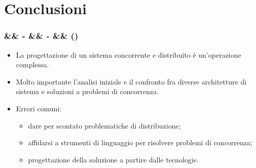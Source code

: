 \documentclass[slidestop,compress,blackandwhite]{beamer}
\newcommand{\cm}[1]{\vspace{#1cm}}
\newcommand{\newtitle}[4]{
	#1 
	\ifx&#2&%
	\else
  		\large- #2
	\fi
	\ifx&#3&%
	\else
  		\normalsize- #3
	\fi
	\ifx&#4&%
	\else
  		\normalsize (#4)
	\fi
}
\newcommand{\newframe}[5]{
	\begin{frame}
		\frametitle{\newtitle{#1}{#2}{#3}{#4}}
		#5
	\end{frame}
}
\newcommand{\myitemize}[1]{
	\begin{itemize}\itemsep4pt
	#1
	\end{itemize}
}
\begin{document}
\section{Conclusioni}\label{conclusions}
	
	\newframe{}{}{}{}{
		\cm{0.5}
		\myitemize {
			\item La progettazione di un sistema concorrente e distribuito è un'operazione complessa.
			\item Molto importante l'analisi iniziale e il confronto fra diverse architetture di sistema e soluzioni a problemi di concorrenza.
			\item Errori comuni:
				\myitemize {
					\item dare per scontato problematiche di distribuzione;
					\item affidarsi a strumenti di linguaggio per risolvere problemi di concorrenza;
					\item progettazione della soluzione a partire dalle tecnologie.
				}
		}
	}
	
\end{document}
